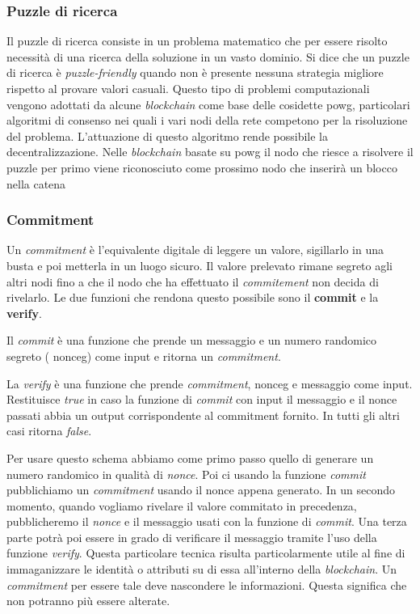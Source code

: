 \subsubsection{Puzzle di ricerca}
Il puzzle di ricerca consiste in un problema matematico che per essere risolto necessità di una ricerca della soluzione in un vasto dominio. Si dice che un puzzle di ricerca è \textit{puzzle-friendly} quando non è presente nessuna strategia migliore rispetto al provare valori casuali. Questo tipo di problemi computazionali vengono adottati da alcune \emph{blockchain} come base delle cosidette \gls{powg}, particolari algoritmi di consenso nei quali i vari nodi della rete competono per la risoluzione del problema. L'attuazione di questo algoritmo rende possibile la decentralizzazione. Nelle \emph{blockchain} basate su \gls{powg} il nodo che riesce a risolvere il puzzle per primo viene riconosciuto come prossimo nodo che inserirà un blocco nella catena 

\subsubsection{Commitment}
Un \emph{commitment} è l'equivalente digitale di leggere un valore, sigillarlo in una busta e poi metterla in un luogo sicuro. Il valore prelevato rimane segreto agli altri nodi fino a che il nodo che ha effettuato il \emph{commitement} non decida di rivelarlo. Le due funzioni che rendona questo possibile sono il \textbf{commit} e la \textbf{verify}.

Il \emph{commit} è una funzione che prende un messaggio e un numero randomico segreto ( \gls{nonceg}\glsfirstoccur) come input e ritorna un  \emph{commitment}.

La \emph{verify} è una funzione che prende \emph{commitment}, \gls{nonceg} e messaggio come input. Restituisce \emph{true} in caso la funzione di \emph{commit} con input il messaggio e il nonce passati abbia un output corrispondente al commitment fornito. In tutti gli altri casi ritorna \emph{false}.

Per usare questo schema abbiamo come primo passo quello di generare un numero randomico in qualità di \textit{nonce}. Poi ci usando la funzione \emph{commit} pubblichiamo un \emph{commitment} usando il nonce appena generato. In un secondo momento, quando vogliamo rivelare il valore commitato in precedenza, pubblicheremo il \textit{nonce} e il messaggio usati con la funzione di \emph{commit}. Una terza parte potrà poi essere in grado di verificare il messaggio tramite l'uso della funzione \emph{verify}.
Questa particolare tecnica risulta particolarmente utile al fine di immaganizzare le identità o attributi su di essa all'interno della \emph{blockchain}. Un \emph{commitment} per essere tale deve nascondere le informazioni. Questa significa che non potranno più essere alterate. 

